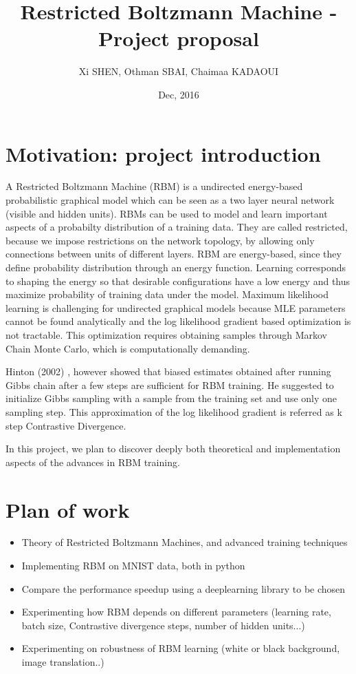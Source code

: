 \documentclass[a4paper,10pt]{article}
\author{Xi SHEN, Othman SBAI, Chaimaa KADAOUI}
\title{Restricted Boltzmann Machine - Project proposal}
\date{Dec, 2016}
\begin{document}
\maketitle
\section{Motivation: project introduction}
A Restricted Boltzmann Machine (RBM) is a undirected energy-based probabilistic graphical model which can be seen as a two layer neural network (visible and hidden units). RBMs can be used to model and learn important aspects of a probabilty distribution of a training data. They are called restricted, because we impose restrictions on the network topology, by allowing only connections between units of different layers. RBM are energy-based, since they define probability distribution through an energy function. Learning corresponds to shaping the energy so that desirable configurations have a low energy and thus maximize probability of training data under the model. Maximum likelihood learning is challenging for undirected graphical models because MLE parameters cannot be found analytically and the log likelihood gradient based optimization is not tractable. This optimization requires obtaining samples through Markov Chain Monte Carlo, which is computationally demanding. 

Hinton (2002) \cite{praticalGuide}, however showed that biased estimates obtained after running Gibbs chain after a few steps are sufficient for RBM training. He suggested to initialize Gibbs sampling with a sample from the training set and use only one sampling step. This approximation of the log likelihood gradient is referred as k step Contrastive Divergence.

In this project, we plan to discover deeply both theoretical and implementation aspects of the advances in RBM training. 

\section{Plan of work}

\begin{itemize}
	\item Theory of Restricted Boltzmann Machines, and advanced training techniques
	\item Implementing RBM on MNIST data, both in python
	\item Compare the performance speedup using a deeplearning library to be chosen
	\item Experimenting how RBM depends on different parameters (learning rate, batch size, Contrastive divergence steps, number of hidden units...)
	\item Experimenting on robustness of RBM learning (white or black background, image translation..)
\end{itemize}
\end{document}
